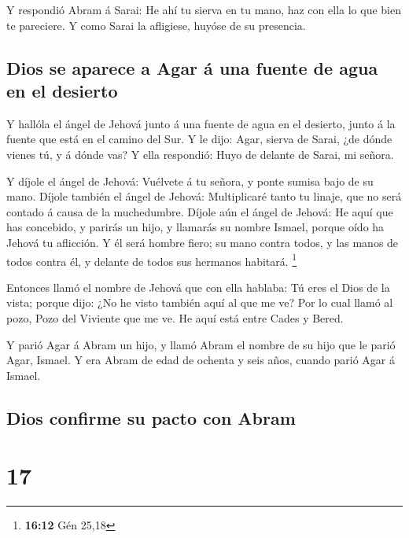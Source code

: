  Y respondió Abram á Sarai: He ahí tu sierva en tu mano,
haz con ella lo que bien te pareciere. Y como Sarai la afligiese, huyóse
de su presencia.

\hypertarget{dios-se-aparece-a-agar-uxe1-una-fuente-de-agua-en-el-desierto}{%
\subsection{Dios se aparece a Agar á una fuente de agua en el
desierto}\label{dios-se-aparece-a-agar-uxe1-una-fuente-de-agua-en-el-desierto}}

 Y hallóla el ángel de Jehová junto á una fuente de agua
en el desierto, junto á la fuente que está en el camino del Sur.
 Y le dijo: Agar, sierva de Sarai, ¿de dónde vienes tú, y
á dónde vas? Y ella respondió: Huyo de delante de Sarai, mi señora.

 Y díjole el ángel de Jehová: Vuélvete á tu señora, y
ponte sumisa bajo de su mano.  Díjole también el ángel de
Jehová: Multiplicaré tanto tu linaje, que no será contado á causa de la
muchedumbre.  Díjole aún el ángel de Jehová: He aquí que
has concebido, y parirás un hijo, y llamarás su nombre Ismael, porque
oído ha Jehová tu aflicción.  Y él será hombre fiero; su
mano contra todos, y las manos de todos contra él, y delante de todos
sus hermanos habitará. \footnote{\textbf{16:12} Gén 25,18}

 Entonces llamó el nombre de Jehová que con ella hablaba:
Tú eres el Dios de la vista; porque dijo: ¿No he visto también aquí al
que me ve?  Por lo cual llamó al pozo, Pozo del Viviente
que me ve. He aquí está entre Cades y Bered.

 Y parió Agar á Abram un hijo, y llamó Abram el nombre de
su hijo que le parió Agar, Ismael.  Y era Abram de edad
de ochenta y seis años, cuando parió Agar á Ismael.

\hypertarget{dios-confirme-su-pacto-con-abram}{%
\subsection{Dios confirme su pacto con
Abram}\label{dios-confirme-su-pacto-con-abram}}

\hypertarget{section-16}{%
\section{17}\label{section-16}}

